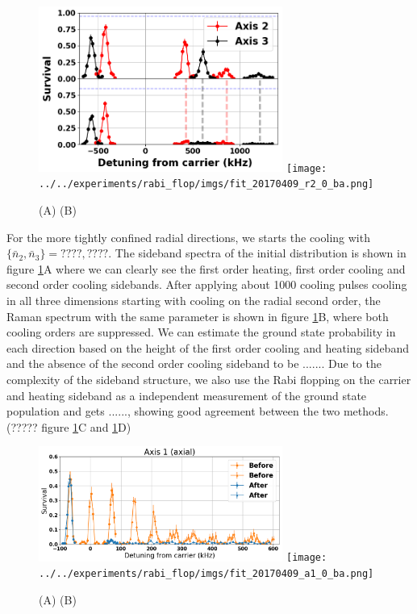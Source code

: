 \documentclass[aps,prl,twocolumn,groupedaddress]{revtex4-1}
\begin{document}
\begin{figure}
  \includegraphics[width=8cm]{imgs/spectrum_r.png}
  \texttt{[image: ../../experiments/rabi\_flop/imgs/fit\_20170409\_r2\_0\_ba.png]}
  \caption{(A) (B) \label{f-radial}}
\end{figure}

For the more tightly confined radial directions, we starts the cooling with $\{\bar n_2, \bar n_3\}=????, ????$. The sideband spectra of the initial distribution is shown in figure \ref{f-radial}A where we can clearly see the first order heating, first order cooling and second order cooling sidebands. After applying about 1000 cooling pulses cooling in all three dimensions starting with cooling on the radial second order, the Raman spectrum with the same parameter is shown in figure \ref{f-radial}B, where both cooling orders are suppressed. We can estimate the ground state probability in each direction based on the height of the first order cooling and heating sideband and the absence of the second order cooling sideband to be $......$. Due to the complexity of the sideband structure, we also use the Rabi flopping on the carrier and heating sideband as a independent measurement of the ground state population and gets $......$, showing good agreement between the two methods. (????? figure \ref{f-radial}C and \ref{f-radial}D)\\

\begin{figure}
  \includegraphics[width=8cm]{imgs/spectrum_a1.png}
  \texttt{[image: ../../experiments/rabi\_flop/imgs/fit\_20170409\_a1\_0\_ba.png]}
  \caption{(A) (B) \label{f-axial}}
\end{figure}
\end{document}
